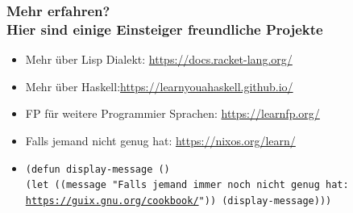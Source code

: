 \documentclass{beamer}
\def\code#1{\texttt{#1}}
\begin{document}
\begin{frame}
\centering
\frametitle{Mehr erfahren? \\ Hier sind einige Einsteiger freundliche Projekte}
\begin{itemize}
    \item Mehr über Lisp Dialekt: \url{https://docs.racket-lang.org/}
    \item Mehr über Haskell:\url{https://learnyouahaskell.github.io/}
     \item FP für weitere Programmier Sprachen: \url{https://learnfp.org/}
    \item Falls jemand nicht genug hat: \url{https://nixos.org/learn/}
    \item \code{(defun display-message () \\
  (let ((message "Falls jemand immer noch nicht genug hat: \url{https://guix.gnu.org/cookbook/}"))
(display-message)))}

\end{itemize}

\end{frame}
\end{document}

